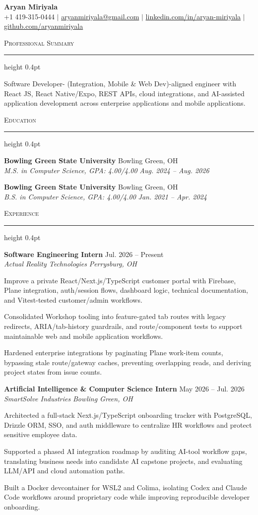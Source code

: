 \documentclass[letterpaper,11pt]{article}
\newcommand{\resumesection}[1]{%
  \par\vspace{2pt}%
  {\large\scshape #1}\par\vspace{2pt}%
  \hrule height 0.4pt\vspace{2pt}%
}
\newcommand{\resumeSubheading}[4]{
  \textbf{#1} \hfill #2\\
  \textit{#3} \hfill \textit{#4}
}
\begin{document}
\begin{center}
  {\LARGE \textbf{Aryan Miriyala}}\\[-1pt]
  \small
  +1 419-315-0444 $|$
  \href{mailto:aryanmiriyala@gmail.com}{aryanmiriyala@gmail.com} $|$
  \href{https://www.linkedin.com/in/aryan-miriyala-7788a21b6/}{linkedin.com/in/aryan-miriyala} $|$
  \href{https://github.com/aryanmiriyala}{github.com/aryanmiriyala}
\end{center}\vspace{-10pt}

\resumesection{Professional Summary}
Software Developer- (Integration, Mobile \& Web Dev)-aligned engineer with React JS, React Native/Expo, REST APIs, cloud integrations, and AI-assisted application development across enterprise applications and mobile applications.

\resumesection{Education}
\resumeSubheading
{Bowling Green State University}{Bowling Green, OH}
{M.S. in Computer Science, GPA: 4.00/4.00}{Aug. 2024 -- Aug. 2026}

\resumeSubheading
{Bowling Green State University}{Bowling Green, OH}
{B.S. in Computer Science, GPA: 4.00/4.00}{Jan. 2021 -- Apr. 2024}

\resumesection{Experience}
\resumeSubheading
{Software Engineering Intern}{Jul. 2026 -- Present}
{Actual Reality Technologies}{Perrysburg, OH}
\begin{tightitemize}
  \item Improve a private React/Next.js/TypeScript customer portal with Firebase, Plane integration, auth/session flows, dashboard logic, technical documentation, and Vitest-tested customer/admin workflows.
  \item Consolidated Workshop tooling into feature-gated tab routes with legacy redirects, ARIA/tab-history guardrails, and route/component tests to support maintainable web and mobile application workflows.
  \item Hardened enterprise integrations by paginating Plane work-item counts, bypassing stale route/gateway caches, preventing overlapping reads, and deriving project states from issue counts.
\end{tightitemize}

\resumeSubheading
{Artificial Intelligence \& Computer Science Intern}{May 2026 -- Jul. 2026}
{SmartSolve Industries}{Bowling Green, OH}
\begin{tightitemize}
  \item Architected a full-stack Next.js/TypeScript onboarding tracker with PostgreSQL, Drizzle ORM, SSO, and auth middleware to centralize HR workflows and protect sensitive employee data.
  \item Supported a phased AI integration roadmap by auditing AI-tool workflow gaps, translating business needs into candidate AI capstone projects, and evaluating LLM/API and cloud automation paths.
  \item Built a Docker devcontainer for WSL2 and Colima, isolating Codex and Claude Code workflows around proprietary code while improving reproducible developer onboarding.
\end{tightitemize}
\end{document}

